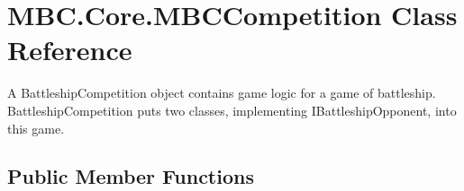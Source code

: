 \hypertarget{class_m_b_c_1_1_core_1_1_m_b_c_competition}{\section{M\-B\-C.\-Core.\-M\-B\-C\-Competition Class Reference}
\label{class_m_b_c_1_1_core_1_1_m_b_c_competition}
}


A Battleship\-Competition object contains game logic for a game of battleship. Battleship\-Competition puts two classes, implementing I\-Battleship\-Opponent, into this game. 


\subsection*{Public Member Functions}
